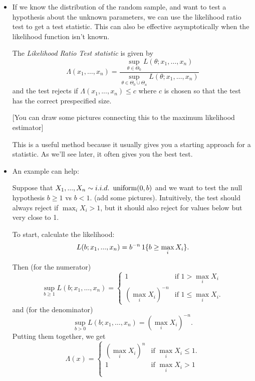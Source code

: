 \begin{itemize}[leftmargin=0pt]

\item If we know the distribution of the random sample, and want to
  test a hypothesis about the unknown parameters, we can use the
  likelihood ratio test to get a test statistic.  This can also be
  effective asymptotically when the likelihood function isn't known.

  The \emph{Likelihood Ratio Test statistic} is given by
  \begin{equation*}
    \Lambda(x_1,\dots,x_n) =
    \frac{\sup_{\theta \in \Theta_0} L(\theta; x_1,\dots,x_n)}{\sup_{\theta \in \Theta_0 \cup \Theta_a} L(\theta; x_1,\dots,x_n)}
  \end{equation*}
  and the test rejects if $\Lambda(x_1,...,x_n) \leq c$ where $c$ is chosen so
  that the test has the correct prespecified size.

  [You can draw some pictures connecting this to the maximum
  likelihood estimator]

  This is a useful method because it usually gives you a starting
  approach for a statistic.  As we'll see later, it often gives you
  the best test.

\item An example can help:
  \begin{ex}
    Suppose that $X_1,...,X_n \sim \iid\ \uniform(0, b)$ and we want to
    test the null hypothesis $b \geq 1$ vs $b < 1$.  (add some pictures).
    Intuitively, the test should always reject if $\max_i X_i > 1$,
    but it should also reject for values below but very close to 1.
    
    To start, calculate the likelihood:
    \begin{equation*}
      L(b; x_1,...,x_n) = b^{-n} \operatorname{1}\{b \geq \max_i X_i\}.
    \end{equation*}
    
    Then (for the numerator)
    \begin{equation*}
      \sup_{b \geq 1} L(b; x_1,\dots,x_n) =
      \begin{cases}
        1 & \text{if } 1 > \max_i X_i \\
        (\max_i X_i)^{-n} & \text{if } 1 \leq \max_i X_i.
      \end{cases}
    \end{equation*}
    and (for the denominator)
    \begin{equation*}
      \sup_{b > 0} L(b; x_1,\dots,x_n) = (\max_i X_i)^{-n}.
    \end{equation*}
    Putting them together, we get
    \begin{equation*}
      \Lambda(x) =
      \begin{cases}
        (\max_i X_i)^n & \text{if } \max_i X_i \leq 1. \\
        1 & \text{if } \max_i X_i > 1 \\
      \end{cases}
    \end{equation*}


\end{ex}
\end{itemize}
